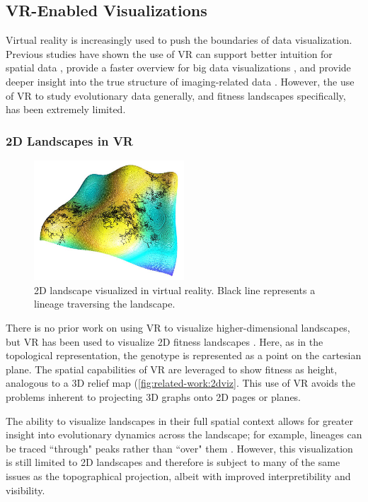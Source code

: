 \subsection{VR-Enabled Visualizations}

Virtual reality is increasingly used to push the boundaries of data visualization. Previous studies have shown the use of VR can support better intuition for spatial data \citep{ambinder_human_2009}, provide a faster overview for big data visualizations \citep{olshannikova_visualizing_2015}, and provide deeper insight into the true structure of imaging-related data \citep{el_beheiry_virtual_2019}. However, the use of VR to study evolutionary data generally, and fitness landscapes specifically, has been extremely limited.

\subsubsection{2D Landscapes in VR}

\begin{figure}
    \centering
    \includegraphics[width=0.5\textwidth]{chapters/3-vr-viz/figs/2dviz.png}
    \caption{2D landscape visualized in virtual reality. Black line represents a lineage traversing the landscape.}
    \label{fig:related-work:2dviz}
\end{figure}

There is no prior work on using VR to visualize higher-dimensional landscapes, but VR has been used to visualize 2D fitness landscapes \citep{dolson_visualizing_2018, dolson_interpreting_2020}. 
Here, as in the topological representation, the genotype is represented as a point on the cartesian plane. 
The spatial capabilities of VR are leveraged to show fitness as height, analogous to a 3D relief map (\autoref{fig:related-work:2dviz}. 
This use of VR avoids the problems inherent to projecting 3D graphs onto 2D pages or planes. 

The ability to visualize landscapes in their full spatial context allows for greater insight into evolutionary dynamics across the landscape; for example, lineages can be traced ``through" peaks rather than ``over" them \citep{dolson_visualizing_2018}. 
However, this visualization is still limited to 2D landscapes and therefore is subject to many of the same issues as the topographical projection, albeit with improved interpretibility and visibility. 

